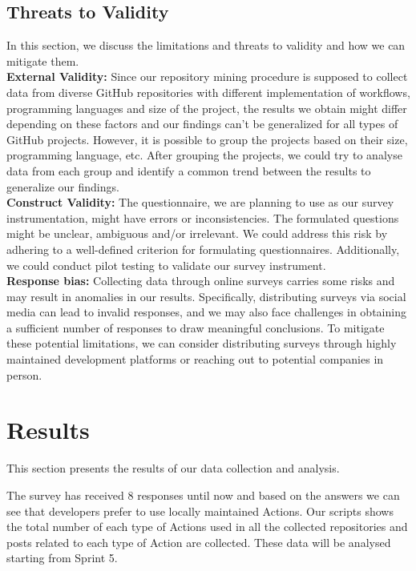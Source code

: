 \documentclass[conference]{IEEEtran}
\begin{document}
    \subsection{Threats to Validity}
        In this section, we discuss the limitations and threats to
        validity and how we can mitigate them.\\

        \textbf{External Validity:} Since our repository mining procedure is supposed to collect data from diverse GitHub repositories with different implementation of workflows, programming languages and size of the project, the results we obtain might differ depending on these factors and our findings can’t be generalized for all types of GitHub projects. However, it is possible to group the projects based on their size, programming language, etc. After grouping the projects, we could try to analyse data from each group and identify a common trend between the results to generalize our findings.\\

	\textbf{Construct Validity:} The questionnaire, we are planning to use as our survey instrumentation, might have errors or inconsistencies. The formulated questions might be unclear, ambiguous and/or irrelevant. We could address this risk by adhering to a well-defined criterion for formulating questionnaires. Additionally, we could conduct pilot testing to validate our survey instrument.\\

        \textbf{Response bias:} Collecting data through online surveys carries some risks and may result in anomalies in our results. Specifically, distributing surveys via social media can lead to invalid responses, and we may also face challenges in obtaining a sufficient number of responses to draw meaningful conclusions. To mitigate these potential limitations, we can consider distributing surveys through highly maintained development platforms or reaching out to potential companies in person. 


\section{Results}

This section presents the results of our data collection and analysis.

The survey has received 8 responses until now and based on the answers we can see that developers prefer to use locally maintained Actions. Our scripts shows the total number of each type of Actions used in all the collected repositories and posts related to each type of Action are collected. These data will be analysed starting from Sprint 5.
\end{document}
